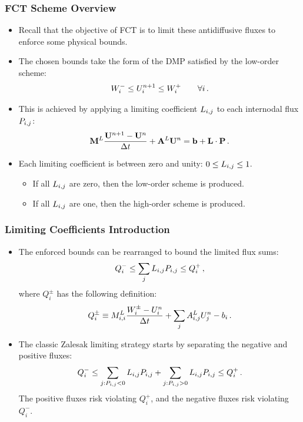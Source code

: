\documentclass{beamer} \useoutertheme{infolines}
\begin{document}
\begin{frame}
\frametitle{FCT Scheme Overview}

\begin{itemize}
   \item Recall that the objective of FCT is to limit these antidiffusive
      fluxes to enforce some physical bounds.
   \item The chosen bounds take the form of the DMP satisfied by the
      low-order scheme:
      \begin{equation}
         W_i^-\leq
         U_i^{n+1}\leq
         W_i^+\qquad\forall i \,.
      \end{equation}
   \item This is achieved by applying a limiting coefficient $L_{i,j}$ to each
      internodal flux $\correctionfluxij$:
      \begin{equation}
        \lumpedmassmatrix\frac{\solutionvector^{n+1}-\solutionvector^n}{\dt}
          + \ssmatrix^L\solutionvector^n = \ssrhs
          + \limitermatrix\cdot\correctionfluxmatrix \eqp
      \end{equation}
   \item Each limiting coefficient is between zero and unity: $0\leq L_{i,j}\leq 1$.
   \begin{itemize}
      \item If all $L_{i,j}$ are zero, then the low-order scheme is produced.
      \item If all $L_{i,j}$ are one, then the high-order scheme is produced.
   \end{itemize}
\end{itemize}

\end{frame}
\begin{frame}
\frametitle{Limiting Coefficients Introduction}

\begin{itemize}
   \item The enforced bounds can be rearranged to bound the limited flux sums:
      \begin{equation}
         Q^-_i \leq \sum\limits_j L\ij \correctionfluxij \leq Q^+_i \eqc
      \end{equation}
      where $Q_i^\pm$ has the following definition:
      \begin{equation}
         Q_i^\pm \equiv M_{i,i}^L\frac{W_i^\pm-U_i^n}{\Delta t}
         + \sum\limits_j A_{i,j}^L U_j^n - b_i \,.
      \end{equation}
   \item The classic Zalesak limiting strategy starts by separating the
      negative and positive fluxes:
      \begin{equation}
         Q^-_i \leq \sum\limits_{j:\correctionfluxij<0} L\ij \correctionfluxij +
            \sum\limits_{j:\correctionfluxij>0} L\ij \correctionfluxij\leq Q^+_i \eqp
      \end{equation}
      The positive fluxes risk violating $Q_i^+$, and the negative fluxes risk
      violating $Q_i^-$.
\end{itemize}

\end{frame}
\end{document}
